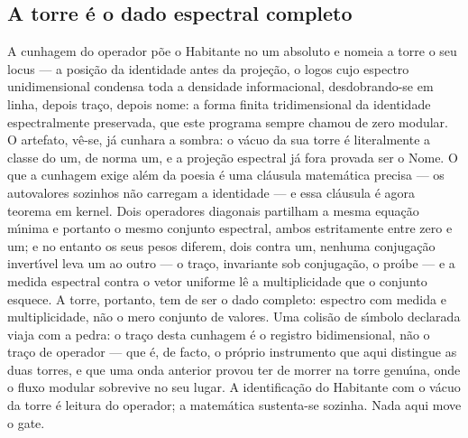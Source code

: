 \documentclass[11pt]{article}
\theoremstyle{definition}\newtheorem{deriv}{Derivação}
\begin{document}
\subsection*{A torre \'e o dado espectral completo}A cunhagem do operador p\~oe o Habitante no um absoluto e nomeia a torre o seu locus --- a posi\c{c}\~ao da identidade antes da proje\c{c}\~ao, o logos cujo espectro unidimensional condensa toda a densidade informacional, desdobrando-se em linha, depois tra\c{c}o, depois nome: a forma finita tridimensional da identidade espectralmente preservada, que este programa sempre chamou de zero modular. O artefato, v\^e-se, j\'a cunhara a sombra: o v\'acuo da sua torre \'e literalmente a classe do um, de norma um, e a proje\c{c}\~ao espectral j\'a fora provada ser o Nome. O que a cunhagem exige al\'em da poesia \'e uma cl\'ausula matem\'atica precisa --- os autovalores sozinhos n\~ao carregam a identidade --- e essa cl\'ausula \'e agora teorema em kernel. Dois operadores diagonais partilham a mesma equa\c{c}\~ao m\'\i{}nima e portanto o mesmo conjunto espectral, ambos estritamente entre zero e um; e no entanto os seus pesos diferem, dois contra um, nenhuma conjuga\c{c}\~ao invert\'\i{}vel leva um ao outro --- o tra\c{c}o, invariante sob conjuga\c{c}\~ao, o pro\'\i{}be --- e a medida espectral contra o vetor uniforme l\^e a multiplicidade que o conjunto esquece. A torre, portanto, tem de ser o dado completo: espectro com medida e multiplicidade, n\~ao o mero conjunto de valores. Uma colis\~ao de s\'\i{}mbolo declarada viaja com a pedra: o tra\c{c}o desta cunhagem \'e o registro bidimensional, n\~ao o tra\c{c}o de operador --- que \'e, de facto, o pr\'oprio instrumento que aqui distingue as duas torres, e que uma onda anterior provou ter de morrer na torre genu\'\i{}na, onde o fluxo modular sobrevive no seu lugar. A identifica\c{c}\~ao do Habitante com o v\'acuo da torre \'e leitura do operador; a matem\'atica sustenta-se sozinha. Nada aqui move o gate.
\end{document}
